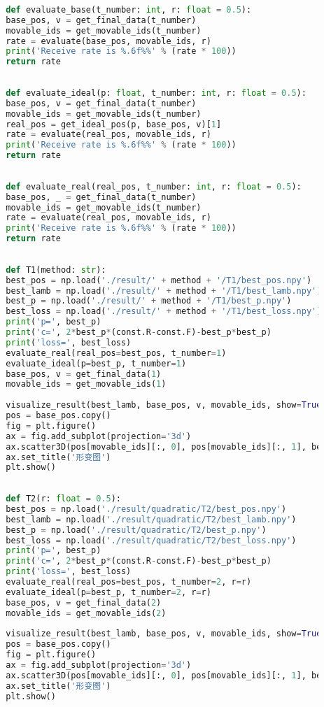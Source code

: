 \documentclass[withoutpreface,bwprint,fontset=macnew]{cumcmthesis} %
\begin{document}
\begin{appendices}
\begin{lstlisting}[language=python]
		
		def evaluate_base(t_number: int, r: float = 0.5):
		base_pos, v = get_final_data(t_number)
		movable_ids = get_movable_ids(t_number)
		rate = evaluate(base_pos, movable_ids, r)
		print('Receive rate is %.6f%%' % (rate * 100))
		return rate
		
		
		def evaluate_ideal(p: float, t_number: int, r: float = 0.5):
		base_pos, v = get_final_data(t_number)
		movable_ids = get_movable_ids(t_number)
		real_pos = get_ideal_pos(p, base_pos, v)[1]
		rate = evaluate(real_pos, movable_ids, r)
		print('Receive rate is %.6f%%' % (rate * 100))
		return rate
		
		
		def evaluate_real(real_pos, t_number: int, r: float = 0.5):
		base_pos, _ = get_final_data(t_number)
		movable_ids = get_movable_ids(t_number)
		rate = evaluate(real_pos, movable_ids, r)
		print('Receive rate is %.6f%%' % (rate * 100))
		return rate
		
		
		def T1(method: str):
		best_pos = np.load('./result/' + method + '/T1/best_pos.npy')
		best_lamb = np.load('./result/' + method + '/T1/best_lamb.npy')
		best_p = np.load('./result/' + method + '/T1/best_p.npy')
		best_loss = np.load('./result/' + method + '/T1/best_loss.npy')
		print('p=', best_p)
		print('c=', 2*best_p*(const.R-const.F)-best_p*best_p)
		print('loss=', best_loss)
		evaluate_real(real_pos=best_pos, t_number=1)
		evaluate_ideal(p=best_p, t_number=1)
		base_pos, v = get_final_data(1)
		movable_ids = get_movable_ids(1)
		
		visualize_result(best_lamb, base_pos, v, movable_ids, show=True, save=False)
		pos = base_pos.copy()
		fig = plt.figure()
		ax = fig.add_subplot(projection='3d')
		ax.scatter3D(pos[movable_ids][:, 0], pos[movable_ids][:, 1], best_lamb, s=4)
		ax.set_title('形变图')
		plt.show()
		
		
		def T2(r: float = 0.5):
		best_pos = np.load('./result/quadratic/T2/best_pos.npy')
		best_lamb = np.load('./result/quadratic/T2/best_lamb.npy')
		best_p = np.load('./result/quadratic/T2/best_p.npy')
		best_loss = np.load('./result/quadratic/T2/best_loss.npy')
		print('p=', best_p)
		print('c=', 2*best_p*(const.R-const.F)-best_p*best_p)
		print('loss=', best_loss)
		evaluate_real(real_pos=best_pos, t_number=2, r=r)
		evaluate_ideal(p=best_p, t_number=2, r=r)
		base_pos, v = get_final_data(2)
		movable_ids = get_movable_ids(2)
		
		visualize_result(best_lamb, base_pos, v, movable_ids, show=True, save=False, rotate=True)
		pos = base_pos.copy()
		fig = plt.figure()
		ax = fig.add_subplot(projection='3d')
		ax.scatter3D(pos[movable_ids][:, 0], pos[movable_ids][:, 1], best_lamb, s=4)
		ax.set_title('形变图')
		plt.show()
		

\end{lstlisting}
\end{appendices}
\end{document}
